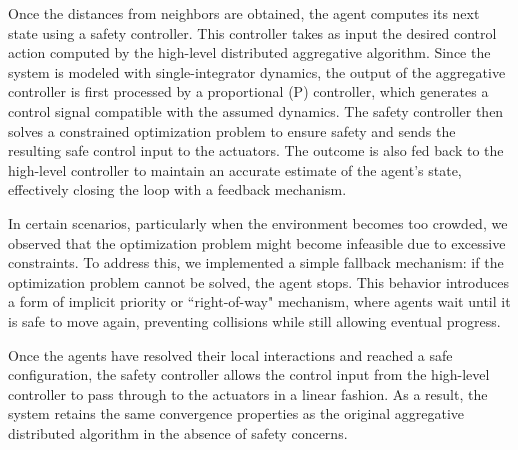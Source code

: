 \medskip
Once the distances from neighbors are obtained, the agent computes its next state using a safety controller. This controller takes as input the desired control action computed by the high-level distributed aggregative algorithm. Since the system is modeled with single-integrator dynamics, the output of the aggregative controller is first processed by a proportional (P) controller, which generates a control signal compatible with the assumed dynamics. The safety controller then solves a constrained optimization problem to ensure safety and sends the resulting safe control input to the actuators. The outcome is also fed back to the high-level controller to maintain an accurate estimate of the agent's state, effectively closing the loop with a feedback mechanism.

\medskip
In certain scenarios, particularly when the environment becomes too crowded, we observed that the optimization problem might become infeasible due to excessive constraints. To address this, we implemented a simple fallback mechanism: if the optimization problem cannot be solved, the agent stops. This behavior introduces a form of implicit priority or ``right-of-way" mechanism, where agents wait until it is safe to move again, preventing collisions while still allowing eventual progress.

\medskip
Once the agents have resolved their local interactions and reached a safe configuration, the safety controller allows the control input from the high-level controller to pass through to the actuators in a linear fashion. As a result, the system retains the same convergence properties as the original aggregative distributed algorithm in the absence of safety concerns.

